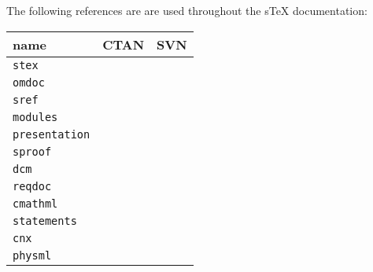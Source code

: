 \documentclass{article}
\begin{document}
The following references are are used throughout the sTeX  documentation: 

\begin{center}
\begin{tabular}{|l|l|l|}\hline
name & CTAN & SVN \\\hline\hline
{\texttt{stex}}         & \cite{Kohlhase:ssmtl08}  &\cite{Kohlhase:ssmtl*}\\\hline
{\texttt{omdoc}}        & \cite{Kohlhase:smomdl08} & \cite{Kohlhase:smomdl*}\\\hline
{\texttt{sref}}        & %
 & \cite{Kohlhase:sref*}\\\hline
{\texttt{modules}}      & \cite{KohAmb:smmssl08}   & \cite{KohAmb:smmssl*}\\\hline
{\texttt{presentation}} & \cite{Kohlhase:ipsmsl08} & \cite{Kohlhase:ipsmsl*}\\\hline
{\texttt{sproof}}       & \cite{Kohlhase:smp08}    & \cite{Kohlhase:smp*}\\\hline
{\texttt{dcm}}          & %
 & \cite{Kohlhase:dcm*}\\\hline
{\texttt{reqdoc}}          & %
 & \cite{Kohlhase:reqdoc*}\\\hline
{\texttt{cmathml}}      & \cite{Kohlhase:tbscml08} & \cite{Kohlhase:tbscml*}\\\hline
{\texttt{statements}}   & \cite{Kohlhase:smms08}   & \cite{Kohlhase:smms*}\\\hline\hline
{\texttt{cnx}}          & \cite{Kohlhase:clbscm08} & \cite{Kohlhase:clbscm*}\\\hline
{\texttt{physml}}       & %
 & \cite{Kohlhase:physml*}\\\hline
\end{tabular}
\end{center}


\end{document}
